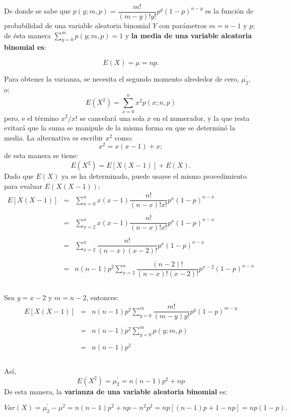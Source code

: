 De donde se sabe que $p(y; m,p) = \dfrac{m!}{(m-y)!y!}p^{y}(1-p)^{n-y}$   es la función de probabilidad de una variable aleatoria binomial $Y$ con parámetros $m=n-1$ y $p$; de ésta manera $\sum_{y=0}^m p(y;m,p) = 1$ y \textbf{la media de una variable  aleatoria binomial es}:

\begin{tcolorbox}
    $$E(X)=\mu = np.$$
\end{tcolorbox}

Para obtener la varianza, se necesita el segundo momento alrededor de cero, $\mu_2^{'}$, o:
$$E(X^2) = \sum\limits_{x=0}^n x^2 p(x;n,p)$$
pero, e el término $x^2/x!$ se cancelará una sola $x$ en el numerador, y la que resta evitará que la suma se manipule de la misma forma en que se determinó la media. La alternativa es escribir $x^2$ como:
$$x^2= x(x-1)+x;$$
de esta manera se tiene:
$$E(X^2) = E[X(X-1)]+E(X).$$
Dado que $E(X)$ ya se ha determinado, puede usarse el mismo procedimiento para evaluar $E(X(X-1))$:
$$\begin{array}{rcl}
    E[X(X-1)]&=&\sum\limits_{x=0}^n x(x-1)\dfrac{n!}{(n-x)!x!}p^x (1-p)^{n-x}\\\\
	     &=&\sum\limits_{x=2}^n x(x-1)\dfrac{n!}{(n-x)!x!}p^x(1-p)^{n-x}\\\\
	     &=&\sum\limits_{x=2}^n \dfrac{n!}{(n-x)(x-2)!}p^x(1-p)^{n-x}\\\\
	     &=&n(n-1)p^2\sum\limits_{x=2}^n \dfrac{(n-2)!}{(n-x)!(x-2)!}p^{x-2}(1-p)^{n-x}\\\\
\end{array}$$

Sea $y=x-2$ y $m=n-2$, entonces:
$$\begin{array}{rcl}
    E[X(X-1)]&=&n(n-1)p^2\sum\limits_{y=0}^m \dfrac{m!}{(m-y)y!}p^y(1-p)^{m-y}\\\\
	     &=&n(n-1)p^2\sum\limits_{y=0}^m p(y;m,p)\\\\
	     &=&n(n-1)p^2\\\\
\end{array}$$

Así,
$$E(X^2) = \mu_2^{'} = n(n-1)p^2+np$$
De esta manera, la \textbf{varianza de una variable aleatoria binomial} es:

\begin{tcolorbox}
    $$Var(X) = \mu_2^{'}-\mu^2 = n(n-1)p^2 + np - n^2p^2 = np[(n-1)p+1-np] = np(1-p).$$
\end{tcolorbox}

